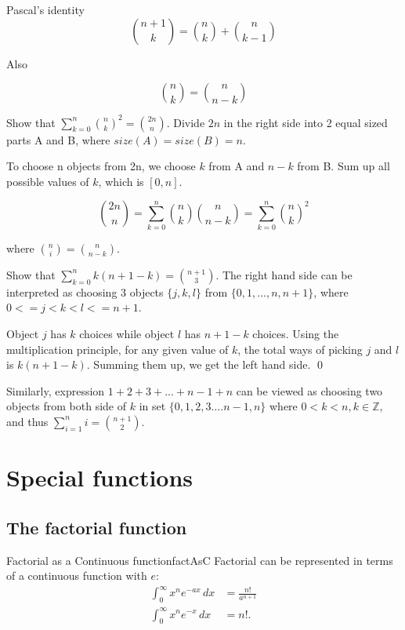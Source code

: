 \documentclass[11pt,a4paper,fleqn]{article}
\numberwithin{equation}{section}
\begin{document}
\begin{fact}{Pascal’s identity}{}
    \[
    \binom{n+1}{k} = \binom{n}{k} + \binom{n}{k-1}
    \]
\end{fact}

Also

\[
{n \choose k} = {n \choose n-k}
\]

\begin{exec}
    Show that $\sum_{k=0}^{n}{n \choose k}^2 = {2n \choose n}.$
    \tcblower
    Divide $2n$ in the right side into 2 equal sized parts A and B, where $size(A)=size(B)=n$.

    To choose n objects from 2n, we choose $k$ from A and $n-k$ from B.
    Sum up all possible values of $k$, which is $[0,n]$.

    \[
    {2n \choose n} = \sum_{k=0}^{n}{n \choose k}{n \choose n-k} = \sum_{k=0}^{n}{n \choose k}^2
    \]

    where ${n \choose i} = {n \choose n-k}$.
\end{exec}

\begin{exec}
    Show that $\sum_{k=0}^{n} k(n+1-k)={n+1 \choose 3}$.
    \tcblower
    The right hand side can be interpreted as choosing 3 objects $\{j,k,l\}$ from $\{0,1,...,n,n+1\}$, where $0<=j<k<l<=n+1$.

    Object $j$ has $k$ choices while object $l$ has $n+1-k$ choices. Using the multiplication principle, for any given value of $k$, the total ways of picking $j$ and $l$ is $k(n+1-k)$. Summing them up, we get the left hand side.
    \qed

    Similarly, expression $1+2+3+...+n-1+n$ can be viewed as choosing two objects from both side of $k$ in set $\{0,1,2,3....n-1,n\}$ where $0<k<n, k \in \mathbb{Z}$, and thus $\sum_{i=1}^{n}i={n+1 \choose 2}$.
\end{exec}


\section{Special functions}

\subsection{The factorial function}

\begin{fact}{Factorial as a Continuous function}{factAsC}
    Factorial can be represented in terms of a continuous function with $e$:
    \begin{align*}
        \int_{0}^{\infty}x^{n}e^{-a x}\,dx&=\frac{n!}{a^{n+1}} \\
        \int_{0}^{\infty}x^{n}e^{-x}\,dx&=n!.
    \end{align*}
\end{fact}
\end{document}
